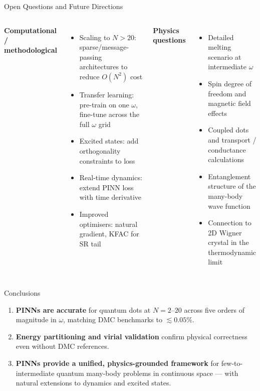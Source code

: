 \documentclass[aspectratio=169,10pt]{beamer}
\begin{document}
\begin{frame}{Open Questions and Future Directions}
  \begin{columns}[T]
      \textbf{Computational / methodological}
      \begin{itemize}
        \item Scaling to $N>20$: sparse/message-passing architectures
              to reduce $O(N^2)$ cost
        \item Transfer learning: pre-train on one $\omega$, fine-tune
              across the full $\omega$ grid
        \item Excited states: add orthogonality constraints to loss
        \item Real-time dynamics: extend PINN loss with time derivative
        \item Improved optimisers: natural gradient, KFAC for SR tail
      \end{itemize}
      \textbf{Physics questions}
      \begin{itemize}
        \item Detailed melting scenario at intermediate $\omega$
        \item Spin degree of freedom and magnetic field effects
        \item Coupled dots and transport / conductance calculations
        \item Entanglement structure of the many-body wave function
        \item Connection to 2D Wigner crystal in the thermodynamic limit
      \end{itemize}
  \end{columns}
\end{frame}

\begin{frame}{Conclusions}
  \begin{enumerate}\itemsep6pt
    \item \textbf{PINNs are accurate} for quantum dots at $N=2$--$20$
          across five orders of magnitude in $\omega$, matching DMC
          benchmarks to $\lesssim 0.05\%$.


    \item \textbf{Energy partitioning and virial validation} confirm
          physical correctness even without DMC references.


    \item \textbf{PINNs provide a unified, physics-grounded framework}
          for few-to-intermediate quantum many-body problems in
          continuous space — with natural extensions to dynamics and
          excited states.
  \end{enumerate}
\end{frame}
\end{document}
